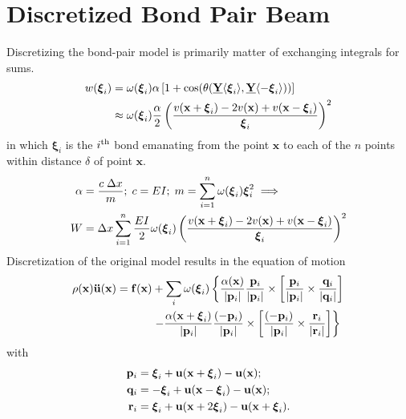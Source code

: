 \section{Discretized Bond Pair Beam}
Discretizing the bond-pair model is primarily matter of exchanging integrals for sums. 
%
\begin{align}
w(\boldsymbol{\xi}_i) &= \omega(\boldsymbol{\xi}_i)\alpha \left[1+\cos(\theta(\vstate{Y}{}{\boldsymbol{\xi}_i},\vstate{Y}{}{-\boldsymbol{\xi}_i})) \right] \notag \\
&\approx \omega(\boldsymbol{\xi}_i)\frac{\alpha}{2}\left(\frac{v(\mathbf{x}+\boldsymbol{\xi}_i)-2v(\mathbf{x})+v(\mathbf{x}-\boldsymbol{\xi}_i)}{\boldsymbol{\xi}_i}\right)^2 \notag
\end{align}
%
in which $\boldsymbol{\xi}_i$ is the $i^\textnormal{th}$ bond emanating from the point $\mathbf{x}$ to each of the $n$ points within distance $\delta$ of point $\mathbf{x}$.
%
\begin{align}
\alpha &= \frac{c\; \Delta x}{m} ;\; c= EI ;\; m=\sum_{i=1}^n \omega(\boldsymbol{\xi}_i)\boldsymbol{\xi}_i^2 \implies \nonumber \\
W&=\Delta x \sum_{i=1}^n \frac{EI}{2}\omega(\boldsymbol{\xi}_i)\left(\frac{v(\mathbf{x}+\boldsymbol{\xi}_i)-2v(\mathbf{x})+v(\mathbf{x}-\boldsymbol{\xi}_i)}{\boldsymbol{\xi}_i}\right)^2\notag
\end{align}
%
Discretization of the original model results in the equation of motion
\begin{align}
\rho(\mathbf{x})\mathbf{\ddot{u}}(\mathbf{x}) = \mathbf{f}(\mathbf{x})&+\sum_i \omega(\boldsymbol{\xi}_i)\left\{\frac{\alpha(\mathbf{x})}{|\mathbf{p}_i |}\frac{\mathbf{p}_i}{|\mathbf{p}_i |}\times \left[ \frac{\mathbf{p}_i}{|\mathbf{p}_i |}\times \frac{\mathbf{q}_i}{|\mathbf{q}_i |}\right] \right. \notag \\
& \left. -\frac{\alpha(\mathbf{x}+\boldsymbol{\xi}_i)}{|\mathbf{p}_i |}\frac{(-\mathbf{p}_i)}{|\mathbf{p}_i |}\times\left[\frac{(-\mathbf{p}_i)}{|\mathbf{p}_i |}\times \frac{\mathbf{r}_i}{|\mathbf{r}_i |} \right] \right\} 
\label{eq:discretebeamEoM}
\end{align}
with
\begin{align}
\mathbf{p}_i &= \boldsymbol{\xi}_i+\mathbf{u}(\mathbf{x}+\boldsymbol{\xi}_i)-\mathbf{u}(\mathbf{x});\notag\\
\mathbf{q}_i &= -\boldsymbol{\xi}_i+\mathbf{u}(\mathbf{x}-\boldsymbol{\xi}_i)-\mathbf{u}(\mathbf{x});\notag\\
\mathbf{r}_i &= \boldsymbol{\xi}_i+\mathbf{u}(\mathbf{x}+2\boldsymbol{\xi}_i)-\mathbf{u}(\mathbf{x}+\boldsymbol{\xi}_i).\notag
\end{align}
